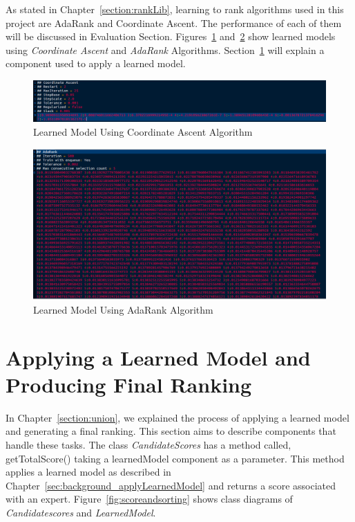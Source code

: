 As stated in Chapter~\ref{section:rankLib}, learning to rank algorithms used in this project are AdaRank and Coordinate Ascent. The performance of each
of them will be discussed in Evaluation Section. Figures~\ref{fig:samplemodel} and~\ref{fig:adarankModel} show learned models 
using \textit{Coordinate Ascent} and \textit{AdaRank} Algorithms.
Section~\ref{section:applyinglearnedmodel} will explain a component used to apply a learned model.

\begin{figure}
\centering
\includegraphics[scale=0.3]{./figures/samplemodel.png}
\caption{Learned Model Using Coordinate Ascent Algorithm} \label{fig:samplemodel} 
\end{figure}

\begin{figure}
\centering
\includegraphics[scale=0.3]{./figures/adarankModel.png}
\caption{Learned Model Using AdaRank Algorithm} \label{fig:adarankModel} 
\end{figure}

\section{Applying a Learned Model and Producing Final Ranking}\label{section:applyinglearnedmodel}
In Chapter~\ref{section:union}, we explained the process of applying a learned model and generating a final ranking. 
This section aims to describe components
that handle these tasks. The class \textit{CandidateScores} has a method called, getTotalScore() taking a learnedModel component as a parameter. 
This method applies a learned model as described in Chapter~\ref{sec:background_applyLearnedModel} and returns a score associated with an expert.
Figure~\ref{fig:scoreandsorting} shows class diagrams of \textit{Candidatescores} and \textit{LearnedModel}.


